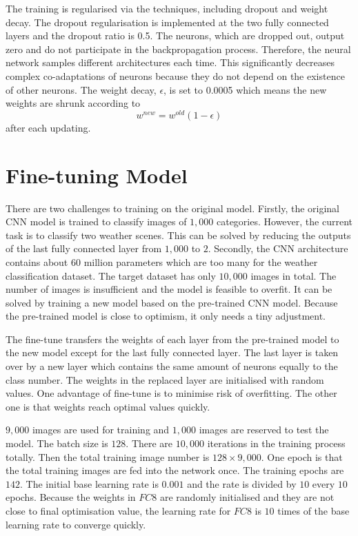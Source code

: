 The training is regularised via the techniques, including dropout and weight decay. The dropout regularisation is implemented at the two fully connected layers and the dropout ratio is 0.5. The neurons, which are dropped out, output zero and do not participate in the backpropagation process. Therefore, the neural network samples different architectures each time. This significantly decreases complex co-adaptations of neurons because they do not depend on the existence of other neurons. The weight decay, $\epsilon$, is set to 0.0005 which means the new weights are shrunk according to 
\begin{equation}\label{eq:WeightDecay}
w^{new} = w^{old}(1 - \epsilon)
\end{equation}
after each updating.

\section{Fine-tuning Model}

There are two challenges to training on the original model. Firstly, the original CNN model is trained to classify images of $1,000$ categories. However, the current task is to classify two weather scenes. This can be solved by reducing the outputs of the last fully connected layer from $1,000$ to $2$. Secondly, the CNN architecture contains about $60$ million parameters which are too many for the weather classification dataset. The target dataset has only $10,000$ images in total. The number of images is insufficient and the model is feasible to overfit. It can be solved by training a new model based on the pre-trained CNN model. Because the pre-trained model is close to optimism, it only needs a tiny adjustment.

The fine-tune transfers the weights of each layer from the pre-trained model to the new model except for the last fully connected layer. The last layer is taken over by a new layer which contains the same amount of neurons equally to the class number. The weights in the replaced layer are initialised with random values. One advantage of fine-tune is to minimise risk of overfitting. The other one is that weights reach optimal values quickly.

$9,000$ images are used for training and $1,000$ images are reserved to test the model. The batch size is $128$. There are $10,000$ iterations in the training process totally. Then the total training image number is $128\times9,000$. One epoch is that the total training images are fed into the network once. The training epochs are $142$. The initial base learning rate is $0.001$ and the rate is divided by $10$ every $10$ epochs. Because the weights in $FC8$ are randomly initialised and they are not close to final optimisation value, the learning rate for $FC8$ is $10$ times of the base learning rate to converge quickly.

